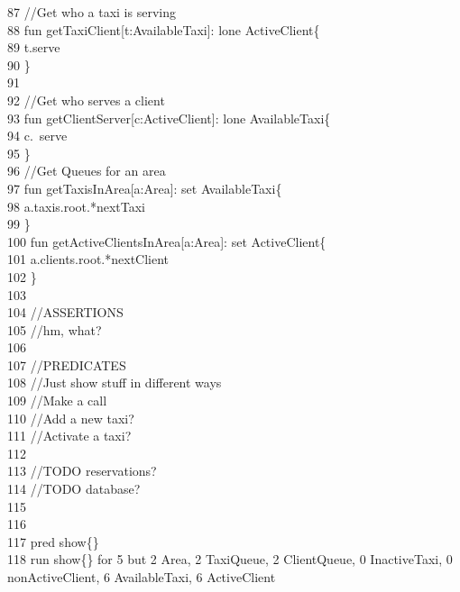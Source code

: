     87	{\color{green}//Get who a taxi is serving}\\
    88	{\color{blue}fun} getTaxiClient[t:AvailableTaxi]: {\color{blue}lone} ActiveClient\{\\
    89	\-\qquad t.serve\\
    90	\}\\
    91	\\
    92	{\color{green}//Get who serves a client}\\
    93	{\color{blue}fun} getClientServer[c:ActiveClient]: {\color{blue}lone} AvailableTaxi\{\\
    94	\-\qquad c.~serve\\
    95	\}\\
    96	{\color{green}//Get Queues for an area}\\
    97	{\color{blue}fun} getTaxisInArea[a:Area]: {\color{blue}set} AvailableTaxi\{\\
    98	\-\qquad a.taxis.root.*nextTaxi\\
    99	\}\\
   100	{\color{blue}fun} getActiveClientsInArea[a:Area]: {\color{blue}set} ActiveClient\{\\
   101	\-\qquad a.clients.root.*nextClient\\
   102	\}\\
   103	\\
   104	{\color{green}//ASSERTIONS}\\
   105	{\color{green}//hm, what?}\\
   106	\\
   107	{\color{green}//PREDICATES}\\
   108	{\color{green}//Just show stuff in different ways}\\
   109	{\color{green}//Make a call}\\
   110	{\color{green}//Add a new taxi?}\\
   111	{\color{green}//Activate a taxi?}\\
   112	\\
   113	{\color{green}//TODO reservations?}\\
   114	{\color{green}//TODO database?}\\
   115	\\
   116	\\
   117	{\color{blue}pred} show\{\}\\
   118	{\color{blue}run} show\{\} {\color{blue}for} 5 {\color{blue}but} 2 Area, 2 TaxiQueue, 2 ClientQueue, 0 InactiveTaxi,  0 nonActiveClient, 6 AvailableTaxi, 6 ActiveClient\\
